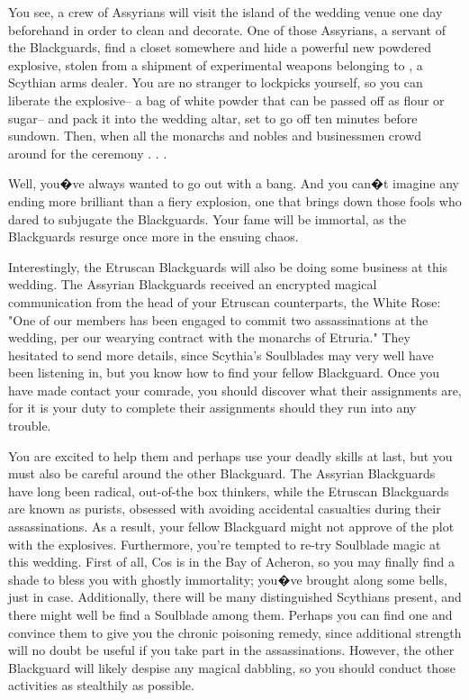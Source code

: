 \documentclass[char]{Kos}
\begin{document}
You see, a crew of Assyrians will visit the island of the wedding venue one day beforehand in order to clean and decorate. One of those Assyrians, a servant of the Blackguards, find a closet somewhere and hide a powerful new powdered explosive, stolen from a shipment of experimental weapons belonging to \cArmsDealer{}, a Scythian arms dealer. You are no stranger to lockpicks yourself, so you can liberate the explosive-- a bag of white powder that can be passed off as flour or sugar-- and pack it into the wedding altar, set to go off ten minutes before sundown. Then, when all the monarchs and nobles and businessmen crowd around for the ceremony . . .

Well, you�ve always wanted to go out with a bang. And you can�t imagine any ending more brilliant than a fiery explosion, one that brings down those fools who dared to subjugate the Blackguards. Your fame will be immortal, as the Blackguards resurge once more in the ensuing chaos.

Interestingly, the Etruscan Blackguards will also be doing some business at this wedding. The Assyrian Blackguards received an encrypted magical communication from the head of your Etruscan counterparts, the White Rose: "One of our members has been engaged to commit two assassinations at the wedding, per our wearying contract with the monarchs of Etruria." They hesitated to send more details, since Scythia's Soulblades may very well have been listening in, but you know how to find your fellow Blackguard. Once you have made contact your comrade, you should discover what their assignments are, for it is your duty to complete their assignments should they run into any trouble.

You are excited to help them and perhaps use your deadly skills at last, but you must also be careful around the other Blackguard. The Assyrian Blackguards have long been radical, out-of-the box thinkers, while the Etruscan Blackguards are known as purists, obsessed with avoiding accidental casualties during their assassinations. As a result, your fellow Blackguard might not approve of the plot with the explosives. Furthermore, you're tempted to re-try Soulblade magic at this wedding. First of all, Cos is in the Bay of Acheron, so you may finally find a shade to bless you with ghostly immortality; you�ve brought along some bells, just in case. Additionally, there will be many distinguished Scythians present, and there might well be find a Soulblade among them. Perhaps you can find one and convince them to give you the chronic poisoning remedy, since additional strength will no doubt be useful if you take part in the assassinations. However, the other Blackguard will likely despise any magical dabbling, so you should conduct those activities as stealthily as possible.
\end{document}
